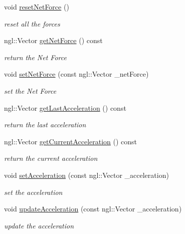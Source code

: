 \begin{DoxyCompactItemize}
void \hyperlink{class_particle_ac8899fda0ce03b91b12421e4867b7158}{resetNetForce} ()
\begin{DoxyCompactList}\small\item\em reset all the forces \item\end{DoxyCompactList}\item 
ngl::Vector \hyperlink{class_particle_aa2d47cd6b196082fffc22b5f43e6d237}{getNetForce} () const 
\begin{DoxyCompactList}\small\item\em return the Net Force \item\end{DoxyCompactList}\item 
void \hyperlink{class_particle_a1f67bd1a59758665c698c07c135e5b10}{setNetForce} (const ngl::Vector \_\-netForce)
\begin{DoxyCompactList}\small\item\em set the Net Force \item\end{DoxyCompactList}\item 
ngl::Vector \hyperlink{class_particle_ab3de889d46b3e95cf91b08674865d128}{getLastAcceleration} () const 
\begin{DoxyCompactList}\small\item\em return the last acceleration \item\end{DoxyCompactList}\item 
ngl::Vector \hyperlink{class_particle_a0c30fc4edf9e8fba9c015cdd0c4d7dc0}{getCurrentAcceleration} () const 
\begin{DoxyCompactList}\small\item\em return the current acceleration \item\end{DoxyCompactList}\item 
void \hyperlink{class_particle_a41bb1603300645f52e875e2b71bfb98c}{setAcceleration} (const ngl::Vector \_\-acceleration)
\begin{DoxyCompactList}\small\item\em set the acceleration \item\end{DoxyCompactList}\item 
void \hyperlink{class_particle_a3dc6c80a3666583b038e90d8baac21e0}{updateAcceleration} (const ngl::Vector \_\-acceleration)
\begin{DoxyCompactList}\small\item\em update the acceleration \item\end{DoxyCompactList}\item 

\end{DoxyCompactItemize}
